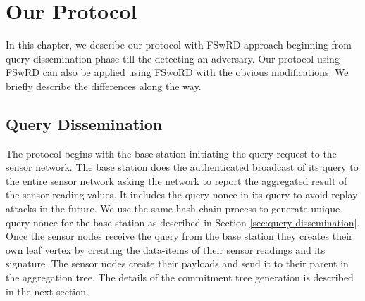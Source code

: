 \chapter{Our Protocol}
	In this chapter, we describe our protocol with FSwRD approach beginning from query dissemination phase till the detecting an adversary.
	Our protocol using FSwRD can also be applied using FSwoRD with the obvious modifications. 
	We briefly describe the differences along the way.


\section{Query Dissemination}
	The protocol begins with the base station initiating the query request to the sensor network.
	The base station does the authenticated broadcast of its query to the entire sensor network asking the network to report the aggregated result of the sensor reading values.
	It includes the query nonce in its query to avoid replay attacks in the future. 
	We use the same hash chain process to generate unique query nonce for the base station as described in Section \ref{sec:query-dissemination}.
	Once the sensor nodes receive the query from the base station they creates their own leaf vertex by creating the data-items of their sensor readings and its signature.
	The sensor nodes create their payloads and send it to their parent in the aggregation tree. 
	The details of the commitment tree generation is described in the next section.

